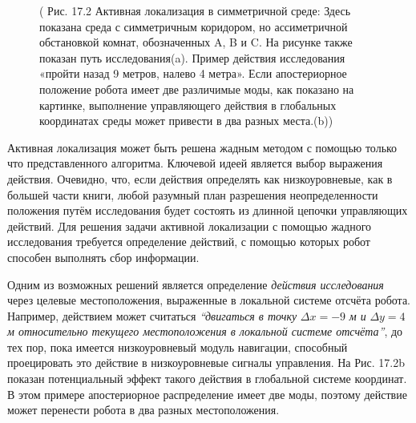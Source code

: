 \documentclass[10pt,a4paper]{article}
\begin{document}
\begin{figure}[H]
	\caption{ ( Рис. 17.2  Активная локализация в симметричной среде: Здесь показана среда с симметричным коридором, но ассиметричной обстановкой комнат, обозначенных A, B и C. На рисунке также показан путь исследования(a).  Пример действия исследования «пройти назад 9 метров, налево 4 метра». Если апостериорное положение робота имеет две различимые моды, как показано на картинке, выполнение управляющего действия в глобальных координатах среды может привести в два разных места.(b)) }
	\label{fig:172orig}
\end{figure}

Активная локализация может быть решена жадным методом с помощью только что представленного алгоритма. Ключевой идеей является выбор выражения действия. Очевидно, что, если действия определять как низкоуровневые, как в большей части книги, любой разумный план разрешения неопределенности положения путём исследования будет состоять из длинной цепочки управляющих действий. Для решения задачи активной локализации с помощью жадного исследования требуется определение действий, с помощью которых робот способен выполнять сбор информации.

Одним из возможных решений является определение \textit{действия исследования} через целевые местоположения, выраженные в локальной системе отсчёта робота. Например, действием может считаться \textit{“двигаться в точку }$\varDelta x = -9$ \textit{м и}  $\varDelta y = 4$ \textit{м относительно текущего местоположения в локальной системе отсчёта”}, до тех пор, пока имеется низкоуровневый модуль навигации, способный проецировать это действие в низкоуровневые сигналы управления. На Рис. 17.2b показан потенциальный эффект такого действия в глобальной системе координат. В этом примере апостериорное распределение имеет две моды, поэтому действие может перенести робота в два разных местоположения.
\end{document}
